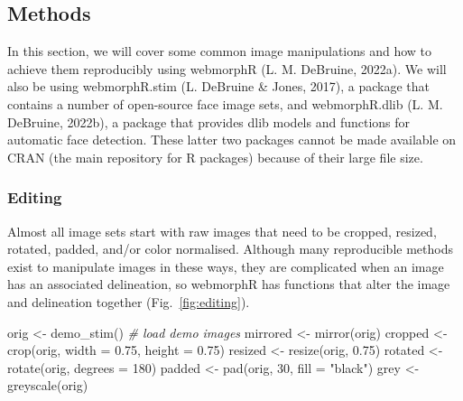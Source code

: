 \documentclass[
  doc,floatsintext]{apa6}
\newenvironment{Shaded}{\begin{snugshade}}{\end{snugshade}}
\newcommand{\AttributeTok}[1]{\textcolor[rgb]{0.77,0.63,0.00}{#1}}
\newcommand{\CommentTok}[1]{\textcolor[rgb]{0.56,0.35,0.01}{\textit{#1}}}
\newcommand{\DecValTok}[1]{\textcolor[rgb]{0.00,0.00,0.81}{#1}}
\newcommand{\FloatTok}[1]{\textcolor[rgb]{0.00,0.00,0.81}{#1}}
\newcommand{\FunctionTok}[1]{\textcolor[rgb]{0.00,0.00,0.00}{#1}}
\newcommand{\NormalTok}[1]{#1}
\newcommand{\OtherTok}[1]{\textcolor[rgb]{0.56,0.35,0.01}{#1}}
\newcommand{\StringTok}[1]{\textcolor[rgb]{0.31,0.60,0.02}{#1}}
\begin{document}
\hypertarget{methods}{%
\subsection{Methods}\label{methods}}

In this section, we will cover some common image manipulations and how to achieve them reproducibly using webmorphR (L. M. DeBruine, 2022a). We will also be using webmorphR.stim (L. DeBruine \& Jones, 2017), a package that contains a number of open-source face image sets, and webmorphR.dlib (L. M. DeBruine, 2022b), a package that provides dlib models and functions for automatic face detection. These latter two packages cannot be made available on CRAN (the main repository for R packages) because of their large file size.

\hypertarget{editing}{%
\subsubsection{Editing}\label{editing}}

Almost all image sets start with raw images that need to be cropped, resized, rotated, padded, and/or color normalised. Although many reproducible methods exist to manipulate images in these ways, they are complicated when an image has an associated delineation, so webmorphR has functions that alter the image and delineation together (Fig.~\ref{fig:editing}).

\begin{Shaded}
\begin{Highlighting}[]
\NormalTok{orig }\OtherTok{\textless{}{-}} \FunctionTok{demo\_stim}\NormalTok{() }\CommentTok{\# load demo images}
\NormalTok{mirrored }\OtherTok{\textless{}{-}} \FunctionTok{mirror}\NormalTok{(orig)}
\NormalTok{cropped  }\OtherTok{\textless{}{-}} \FunctionTok{crop}\NormalTok{(orig, }\AttributeTok{width =} \FloatTok{0.75}\NormalTok{, }\AttributeTok{height =} \FloatTok{0.75}\NormalTok{)}
\NormalTok{resized  }\OtherTok{\textless{}{-}} \FunctionTok{resize}\NormalTok{(orig, }\FloatTok{0.75}\NormalTok{)}
\NormalTok{rotated  }\OtherTok{\textless{}{-}} \FunctionTok{rotate}\NormalTok{(orig, }\AttributeTok{degrees =} \DecValTok{180}\NormalTok{)}
\NormalTok{padded   }\OtherTok{\textless{}{-}} \FunctionTok{pad}\NormalTok{(orig, }\DecValTok{30}\NormalTok{, }\AttributeTok{fill =} \StringTok{"black"}\NormalTok{)}
\NormalTok{grey     }\OtherTok{\textless{}{-}} \FunctionTok{greyscale}\NormalTok{(orig)}
\end{Highlighting}
\end{Shaded}
\end{document}
